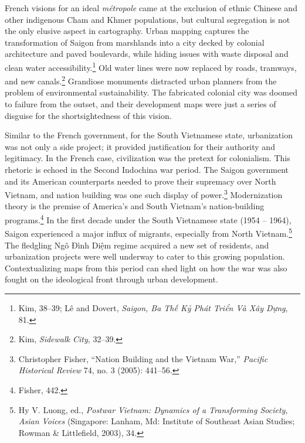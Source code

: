 French visions for an ideal \textit{métropole} came at the exclusion of ethnic Chinese and other indigenous Cham and Khmer populations, but cultural segregation is not the only elusive aspect in cartography. Urban mapping captures the transformation of Saigon from marshlands into a city decked by colonial architecture and paved boulevards, while hiding issues with waste disposal and clean water accessibility.\footnote{Kim, 38–39; Lê and Dovert, \textit{Saigon, Ba Thế Kỷ Phát Triển Và Xây Dựng}, 81.} Old water lines were now replaced by roads, tramways, and new canals.\footnote{Kim, \textit{Sidewalk City}, 32–39.} Grandiose monuments distracted urban planners from the problem of environmental sustainability. The fabricated colonial city was doomed to failure from the outset, and their development maps were just a series of disguise for the shortsightedness of this vision.

Similar to the French government, for the South Vietnamese state, urbanization was not only a side project; it provided justification for their authority and legitimacy. In the French case, civilization was the pretext for colonialism. This rhetoric is echoed in the Second Indochina war period. The Saigon government and its American counterparts needed to prove their supremacy over North Vietnam, and nation building was one such display of power.\footnote{Christopher Fisher, “Nation Building and the Vietnam War,” \textit{Pacific Historical Review} 74, no. 3 (2005): 441–56.} Modernization theory is the premise of America’s and South Vietnam’s nation-building programs.\footnote{Fisher, 442.} In the first decade under the South Vietnamese state (1954 – 1964), Saigon experienced a major influx of migrants, especially from North Vietnam.\footnote{Hy V. Luong, ed., \textit{Postwar Vietnam: Dynamics of a Transforming Society, Asian Voices} (Singapore: Lanham, Md: Institute of Southeast Asian Studies; Rowman \& Littlefield, 2003), 34.} The fledgling Ngô Đình Diệm regime acquired a new set of residents, and urbanization projects were well underway to cater to this growing population. Contextualizing maps from this period can shed light on how the war was also fought on the ideological front through urban development.


